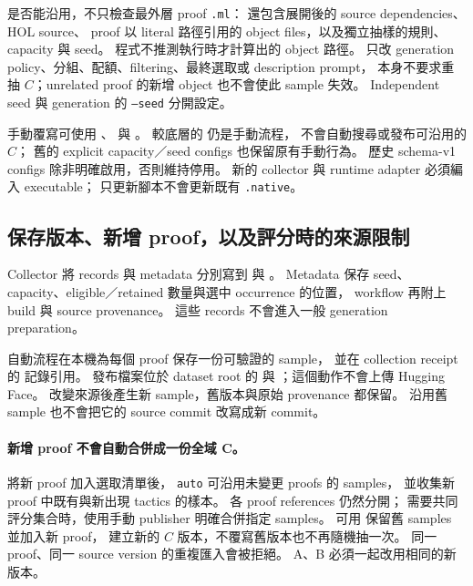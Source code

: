 是否能沿用，\allowbreak 不只檢查最外層 proof \texttt{.ml}：\allowbreak
還包含展開後的 source dependencies、HOL source、\allowbreak
proof 以 literal 路徑引用的 object files，\allowbreak 以及獨立抽樣的規則、capacity 與 seed。
程式不推測執行時才計算出的 object 路徑。
只改 generation policy、分組、配額、filtering、最終選取或 description prompt，\allowbreak
本身不要求重抽 $C$；\allowbreak unrelated proof 的新增 object 也不會使此 sample 失效。
Independent seed 與 generation 的 \texttt{--seed} 分開設定。

手動覆寫可使用 、\allowbreak
{} 與 。
較底層的  仍是手動流程，\allowbreak
不會自動搜尋或發布可沿用的 $C$；\allowbreak
舊的 explicit capacity／seed configs 也保留原有手動行為。
歷史 schema-v1 configs 除非明確啟用，\allowbreak 否則維持停用。
新的 collector 與 runtime adapter 必須編入 executable；\allowbreak
只更新腳本不會更新既有 \texttt{.native}。

\subsection{保存版本、新增 proof，以及評分時的來源限制}

Collector 將 records 與 metadata 分別寫到\allowbreak
{} 與\allowbreak
{}。
Metadata 保存 seed、capacity、eligible／retained 數量與選中 occurrence 的位置，\allowbreak
workflow 再附上 build 與 source provenance。
這些 records 不會進入一般 generation preparation。

自動流程在本機為每個 proof 保存一份可驗證的 sample，\allowbreak
並在 collection receipt 的  記錄引用。
發布檔案位於 dataset root 的  與\allowbreak
{}；\allowbreak 這個動作不會上傳 Hugging Face。
改變來源後產生新 sample，\allowbreak 舊版本與原始 provenance 都保留。
沿用舊 sample 也不會把它的 source commit 改寫成新 commit。

\paragraph{新增 proof 不會自動合併成一份全域 C。}
將新 proof 加入選取清單後，\allowbreak
\texttt{auto} 可沿用未變更 proofs 的 samples，\allowbreak
並收集新 proof 中既有與新出現 tactics 的樣本。
各 proof references 仍然分開；\allowbreak
需要共同評分集合時，\allowbreak 使用手動 publisher 明確合併指定 samples。
可用  保留舊 samples 並加入新 proof，\allowbreak
建立新的 $C$ 版本，\allowbreak 不覆寫舊版本也不再隨機抽一次。
同一 proof、同一 source version 的重複匯入會被拒絕。
A、B 必須一起改用相同的新版本。

